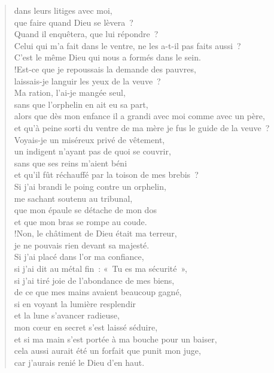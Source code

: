 \documentclass[french,twoside]{book} %
\begin{document}
\begin{verse}
dans leurs litiges avec moi,\\
que faire quand Dieu se lèvera ? \\
Quand il enquêtera, que lui répondre ?\\
Celui qui m’a fait dans le ventre, ne les a-t-il pas faits aussi ? \\
C’est le même Dieu qui nous a formés dans le sein.\\!Est-ce que je repoussais la demande des pauvres, \\
laissais-je languir les yeux de la veuve ?\\
Ma ration, l’ai-je mangée seul, \\
sans que l’orphelin en ait eu sa part,\\
alors que dès mon enfance il a grandi avec moi comme avec un père, \\
et qu’à peine sorti du ventre de ma mère je fus le guide de la veuve ?\\
Voyais-je un miséreux privé de vêtement, \\
un indigent n’ayant pas de quoi se couvrir,\\
sans que ses reins m’aient béni \\
et qu’il fût réchauffé par la toison de mes brebis ?\\
Si j’ai brandi le poing contre un orphelin, \\
me sachant soutenu au tribunal,\\
que mon épaule se détache de mon dos \\
et que mon bras se rompe au coude.\\!Non, le châtiment de Dieu était ma terreur, \\
je ne pouvais rien devant sa majesté.\\
Si j’ai placé dans l’or ma confiance, \\
si j’ai dit au métal fin : « Tu es ma sécurité »,\\
si j’ai tiré joie de l’abondance de mes biens, \\
de ce que mes mains avaient beaucoup gagné,\\
si en voyant la lumière resplendir \\
et la lune s’avancer radieuse,\\
mon cœur en secret s’est laissé séduire, \\
et si ma main s’est portée à ma bouche pour un baiser,\\
cela aussi aurait été un forfait que punit mon juge, \\
car j’aurais renié le Dieu d’en haut.\\

\end{verse}
\end{document}
